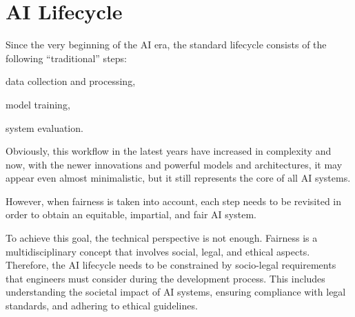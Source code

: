 \documentclass[12pt,a4paper,openright,twoside]{book}
\begin{document}


\section{\acs{AI} Lifecycle}


Since the very beginning of the \ac{AI} era, the standard lifecycle consists of the following ``traditional'' steps:
\begin{enumerate*}[label= (\roman*)]
    \item data collection and processing,
    \item model training,
    \item system evaluation.
\end{enumerate*}
%
Obviously, this workflow in the latest years have increased in complexity and now, with the newer innovations and powerful models and architectures, it may appear even almost minimalistic, but it still represents the core of all \ac{AI} systems.

However, when fairness is taken into account, each step needs to be revisited in order to obtain an equitable, impartial, and fair \ac{AI} system.


To achieve this goal, the technical perspective is not enough.
%
Fairness is a multidisciplinary concept that involves social, legal, and ethical aspects.
%
Therefore, the \ac{AI} lifecycle needs to be constrained by socio-legal requirements that engineers must consider during the development process.
%
This includes understanding the societal impact of \ac{AI} systems, ensuring compliance with legal standards, and adhering to ethical guidelines.
\end{document}
